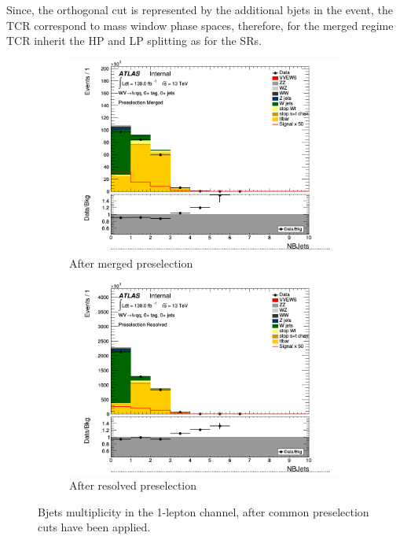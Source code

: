 Since, the orthogonal cut is represented by the additional bjets in the event, 
the TCR correspond to mass window phase spaces, therefore, for the merged regime
TCR inherit the HP and LP splitting as for the SRs.

\begin{figure}[ht]
    \centering
    \begin{subfigure}{0.3\textwidth}
        \includegraphics[width=\linewidth]{figures/1lep/CRPlots/C_0ptag0pjet_0ptv_Presel_Merged_NBJets_Lin.png}
        \caption{After merged preselection}
    \end{subfigure}
    \begin{subfigure}{0.3\textwidth}
        \includegraphics[width=\linewidth]{figures/1lep/CRPlots/C_0ptag0pjet_0ptv_Presel_Resolved_NBJets_Lin.png}
        \caption{After resolved preselection}
    \end{subfigure}
    \caption{Bjets multiplicity in the 1-lepton channel, after common preselection cuts have been applied.}
    \label{fig:1lepNBjetsPresel}
\end{figure}


